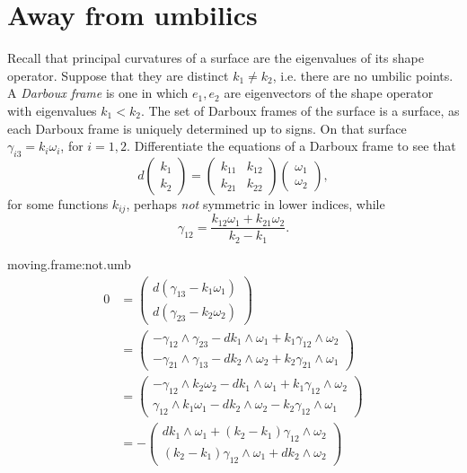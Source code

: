 \section{Away from umbilics}
Recall that principal curvatures of a surface are the eigenvalues of its shape operator.
Suppose that they are distinct \(k_1\ne k_2\), i.e. there are no umbilic points.
A \emph{Darboux frame} is one in which \(e_1,e_2\) are eigenvectors of the shape operator with eigenvalues \(k_1<k_2\).
The set of Darboux frames of the surface is a surface, as each Darboux frame is uniquely determined up to signs.
On that surface \(\gamma_{i3}=k_i\omega_i\), for \(i=1,2\).
%
{Differentiate the equations of a Darboux frame to see that
\[
d
\begin{pmatrix}
k_1\\
k_2
\end{pmatrix}
=
\begin{pmatrix}
k_{11}&k_{12}\\
k_{21}&k_{22}
\end{pmatrix}
\begin{pmatrix}
\omega_1\\
\omega_2
\end{pmatrix},
\]
for some functions \(k_{ij}\), perhaps \emph{not} symmetric in lower indices, while
\[
\gamma_{12}=\frac{k_{12}\omega_1+k_{21}\omega_2}{k_2-k_1}.
\]}
\begin{answer}{moving.frame:not.umb}%
\begin{align*}
0
&=
\begin{pmatrix}
d(\gamma_{13}-k_1\omega_1)\\
d(\gamma_{23}-k_2\omega_2)
\end{pmatrix}
\\
&=
\begin{pmatrix}
-\gamma_{12}\wedge\gamma_{23}-dk_1\wedge\omega_1+k_1\gamma_{12}\wedge\omega_2\\
-\gamma_{21}\wedge\gamma_{13}-dk_2\wedge\omega_2+k_2\gamma_{21}\wedge\omega_1
\end{pmatrix}
\\
&=
\begin{pmatrix}
-\gamma_{12}\wedge k_2\omega_2-dk_1\wedge\omega_1+k_1\gamma_{12}\wedge\omega_2\\
\gamma_{12}\wedge k_1\omega_1-dk_2\wedge\omega_2-k_2\gamma_{12}\wedge\omega_1
\end{pmatrix}
\\
&=
-%
\begin{pmatrix}
dk_1\wedge\omega_1+(k_2-k_1)\gamma_{12}\wedge\omega_2\\
(k_2-k_1)\gamma_{12}\wedge\omega_1+dk_2\wedge\omega_2
\end{pmatrix}
\end{align*}
\end{answer}
